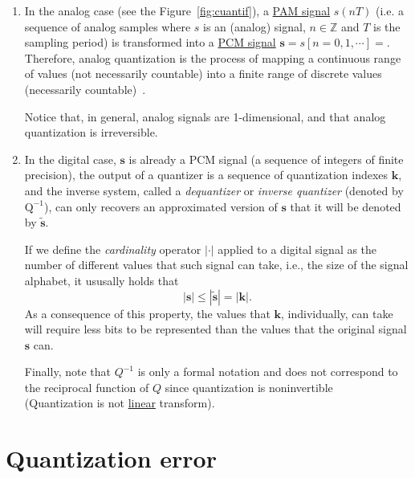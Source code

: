 \begin{enumerate}
\item In the analog case (see the Figure~\ref{fig:cuantif}), a
  \href{https://en.wikipedia.org/wiki/Pulse-amplitude_modulation}{PAM
    signal} $s(nT)$ (i.e. a sequence of analog samples
  where $s$ is an (analog) signal, $n\in{\mathbb{Z}}$ and $T$ is the
  sampling period) is transformed into a
  \href{https://en.wikipedia.org/wiki/Pulse-code_modulation}{PCM
    signal} ${\mathbf s}=s[n=0,1,\cdots]=$. Therefore, analog
  quantization is the process of mapping a continuous range of values
  (not necessarily countable) into a finite range of discrete values
  (necessarily countable)~\cite{vetterli1995wavelets}.

  Notice that, in general, analog signals are 1-dimensional, and that
  analog quantization is irreversible.
  
\item In the digital case, ${\mathbf s}$ is already a PCM signal (a
  sequence of integers of finite precision), the output of a quantizer
  is a sequence of quantization indexes ${\mathbf k}$, and the inverse
  system, called a \emph{dequantizer} or \emph{inverse quantizer}
  (denoted by $\text{Q}^{-1}$), can only recovers an approximated
  version of ${\mathbf s}$ that it will be denoted by $\tilde{\mathbf
    s}$.

  If we define the \emph{cardinality} operator $|\cdot|$ applied to a
  digital signal as the number of different values that such signal
  can take, i.e., the size of the signal alphabet, it ususally holds
  that
  \begin{equation}
    |{\mathbf s}|\leq|\tilde{\mathbf s}| = |{\mathbf k}|.
  \end{equation}
  As a consequence of this property, the values that ${\mathbf k}$,
  individually, can take will require less bits to be represented than
  the values that the original signal ${\mathbf s}$ can.

  Finally, note that $Q^{−1}$ is only a formal notation and does not
  correspond to the reciprocal function of $Q$ since quantization is
  noninvertible~\cite{duhamel2009joint} (Quantization is not
  \href{https://en.wikipedia.org/wiki/Linear_map}{linear} transform).
  
\end{enumerate}

\section{Quantization error}

